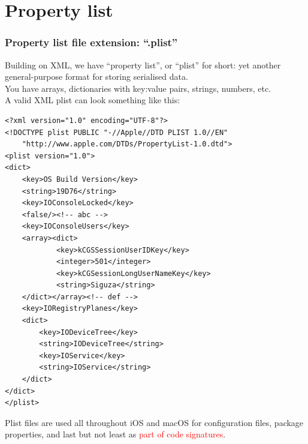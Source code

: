 \documentclass{beamer}
\begin{document}
\section{Property list}
\begin{frame}[fragile]\frametitle{Property list \small{file extension: “.plist”}}\footnotesize
    \begin{flushleft}
        Building on XML, we have “property list”, or “plist” for short: yet another general-purpose format for storing serialised data.\\\vfill You have arrays, dictionaries with key:value pairs, strings, numbers, etc.\\\vfill
        A valid XML plist can look something like this:
    \end{flushleft}
    \begin{multicols}{2}
    \begin{verbatim}
<?xml version="1.0" encoding="UTF-8"?>
<!DOCTYPE plist PUBLIC "-//Apple//DTD PLIST 1.0//EN"
    "http://www.apple.com/DTDs/PropertyList-1.0.dtd">
<plist version="1.0">
<dict>
    <key>OS Build Version</key>
    <string>19D76</string>
    <key>IOConsoleLocked</key>
    <false/><!-- abc -->
    <key>IOConsoleUsers</key>
    <array><dict>
            <key>kCGSSessionUserIDKey</key>
            <integer>501</integer>
            <key>kCGSessionLongUserNameKey</key>
            <string>Siguza</string>
    </dict></array><!-- def -->
    <key>IORegistryPlanes</key>
    <dict>
        <key>IODeviceTree</key>
        <string>IODeviceTree</string>
        <key>IOService</key>
        <string>IOService</string>
    </dict>
</dict>
</plist>
    \end{verbatim}
    \end{multicols}
    Plist files are used all throughout iOS and macOS for configuration files, package properties, and last but not least as \textcolor{red}{part of code signatures}.
\end{frame}
\end{document}
